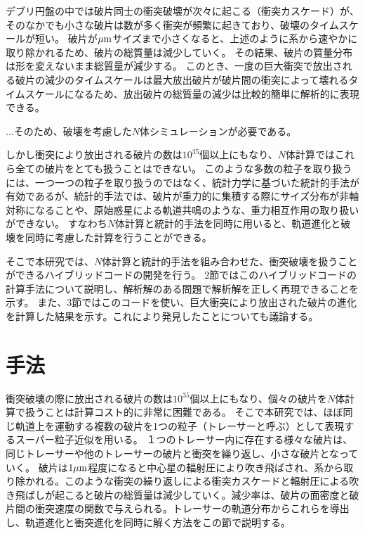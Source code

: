 \documentclass[a4paper,10pt,oneside,twocolumn,notitlepage,final]{jarticle}
\begin{document}
デブリ円盤の中では破片同士の衝突破壊が次々に起こる（衝突カスケード）が、そのなかでも小さな破片は数が多く衝突が頻繁に起きており、破壊のタイムスケールが短い。
破片が$\mu {\rm m}$サイズまで小さくなると、上述のように系から速やかに取り除かれるため、破片の総質量は減少していく。
その結果、破片の質量分布は形を変えないまま総質量が減少する\citep[e.g.,][]{Tanaka1996}。
このとき、一度の巨大衝突で放出される破片の減少のタイムスケールは最大放出破片が破片間の衝突によって壊れるタイムスケールになるため、放出破片の総質量の減少は比較的簡単に解析的に表現できる\citep{Kobayashi2010}。

...そのため、破壊を考慮した$N$体シミュレーションが必要である。





しかし衝突により放出される破片の数は$10^{35}$個以上にもなり、$N$体計算ではこれら全ての破片をとても扱うことはできない。
このような多数の粒子を取り扱うには、一つ一つの粒子を取り扱うのではなく、統計力学に基づいた統計的手法が有効であるが、統計的手法では、破片が重力的に集積する際にサイズ分布が非軸対称になることや、原始惑星による軌道共鳴のような、重力相互作用の取り扱いができない。
すなわち$N$体計算と統計的手法を同時に用いると、軌道進化と破壊を同時に考慮した計算を行うことができる。

そこで本研究では、$N$体計算と統計的手法を組み合わせた、衝突破壊を扱うことができるハイブリッドコードの開発を行う。
2節ではこのハイブリッドコードの計算手法について説明し、解析解のある問題で解析解を正しく再現できることを示す。
また、3節ではこのコードを使い、巨大衝突により放出された破片の進化を計算した結果を示す。これにより発見したことについても議論する。


\section{手法}
衝突破壊の際に放出される破片の数は$10^{35}$個以上にもなり、個々の破片を$N$体計算で扱うことは計算コスト的に非常に困難である。
そこで本研究では、ほぼ同じ軌道上を運動する複数の破片を1つの粒子（トレーサーと呼ぶ）として表現するスーパー粒子近似を用いる。
１つのトレーサー内に存在する様々な破片は、同じトレーサーや他のトレーサーの破片と衝突を繰り返し、小さな破片となっていく。
破片は$1\mu {\rm m}$程度になると中心星の輻射圧により吹き飛ばされ、系から取り除かれる。このような衝突の繰り返しによる衝突カスケードと輻射圧による吹き飛ばしが起こると破片の総質量は減少していく。減少率は、破片の面密度と破片間の衝突速度の関数で与えられる\citep{Kobayashi2010}。トレーサーの軌道分布からこれらを導出し、軌道進化と衝突進化を同時に解く方法をこの節で説明する。
\end{document}
